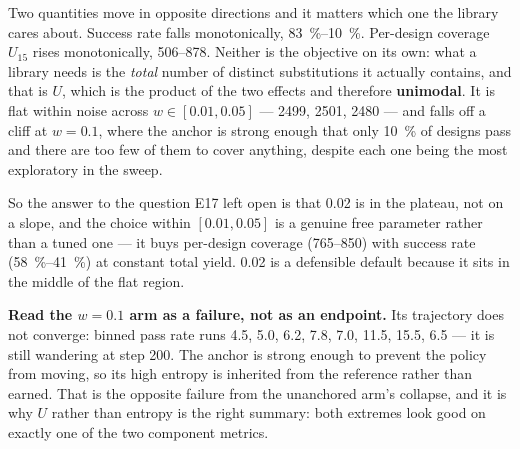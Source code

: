 Two quantities move in opposite directions and it matters which one the library
cares about. Success rate falls monotonically, \SIrange{83}{10}{\percent}.
Per-design coverage $U_{15}$ rises monotonically, \numrange{506}{878}. Neither
is the objective on its own: what a library needs is the \emph{total} number of
distinct substitutions it actually contains, and that is $U$, which is the
product of the two effects and therefore \textbf{unimodal}. It is flat within
noise across $w \in [0.01, 0.05]$ --- 2499, 2501, 2480 --- and falls off a cliff
at $w = 0.1$, where the anchor is strong enough that only \SI{10}{\percent} of
designs pass and there are too few of them to cover anything, despite each one
being the most exploratory in the sweep.

So the answer to the question E17 left open is that \num{0.02} is in the
plateau, not on a slope, and the choice within $[0.01, 0.05]$ is a genuine free
parameter rather than a tuned one --- it buys per-design coverage
(\numrange{765}{850}) with success rate (\SIrange{58}{41}{\percent}) at
constant total yield. \num{0.02} is a defensible default because it sits in the
middle of the flat region.

\textbf{Read the $w{=}0.1$ arm as a failure, not as an endpoint.} Its trajectory
does not converge: binned pass rate runs 4.5, 5.0, 6.2, 7.8, 7.0, 11.5, 15.5,
6.5 --- it is still wandering at step 200. The anchor is strong enough to
prevent the policy from moving, so its high entropy is inherited from the
reference rather than earned. That is the opposite failure from the unanchored
arm's collapse, and it is why $U$ rather than entropy is the right summary: both
extremes look good on exactly one of the two component metrics.
